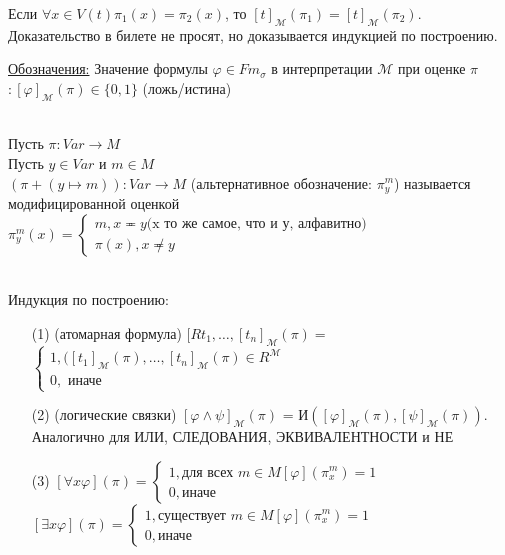 \documentclass[a4paper, fleqn]{article}
\begin{document}
    \begin{lemma}
        Если $∀ x ∈ V(t) \pi_1(x) = \pi_2(x)$, то 
        $[t]_{\mathcal{M}}(\pi_1) = [t]_{\mathcal{M}}(\pi_2)$. \\
        Доказательство в билете не просят,
         но доказывается индукцией по построению.
    \end{lemma}
    \underline{Обозначения:} Значение формулы $\varphi ∈ Fm_{\sigma}$ в интерпретации
    $\mathcal{M}$ при оценке $\pi$ $: [\varphi]_{\mathcal{M}}(\pi) ∈ \{0, 1\}$ (ложь/истина) \\
    \begin{definition} \ \\
        Пусть $\pi: Var → M$ \\
        Пусть $y ∈ Var$ и $m ∈ M$ \\
        $(\pi+(y ↦ m)): Var → M$ (альтернативное обозначение: 
        $\pi_y^m$) называется модифицированной оценкой\\
        $\pi_y^m(x) = \begin{cases}
            m , x \eqcirc y \text{(x то же самое, что и у, алфавитно)} \\
            \pi(x), x \not \eqcirc y
        \end{cases}$ 
    \end{definition}
    \begin{definition} \ \\
        Индукция по построению:
        \begin{itemize}
            \item[(1)] (атомарная формула) 
            $[Rt_1, \ldots, [t_n]_{\mathcal{M}}(\pi) = $
            $\begin{cases}
                1, ([t_1]_{\mathcal{M}}(\pi), \ldots, 
                [t_n]_{\mathcal{M}}(\pi) ∈ R^{\mathcal{M}} \\
                0, \text{ иначе}
            \end{cases}$
            \item[(2)] (логические связки) 
            $[\varphi ∧ \psi]_{\mathcal{M}}(\pi)$ = 
            И$([\varphi]_{\mathcal{M}}(\pi), [\psi]_{\mathcal{M}}(\pi))$.
            Аналогично для ИЛИ, СЛЕДОВАНИЯ, ЭКВИВАЛЕНТНОСТИ и НЕ
            \item[(3)]
            $[∀ x \varphi](\pi) =
            \begin{cases}
                1, \text{для всех } m ∈ M [\varphi](\pi_x^m) = 1\\
                0, \text{иначе}
            \end{cases}$ \\ 
            $[∃ x \varphi](\pi) =
            \begin{cases}
                1, \text{существует } m ∈ M [\varphi](\pi_x^m) = 1\\
                0, \text{иначе}
            \end{cases}$
        \end{itemize}
    \end{definition}
\end{document}
